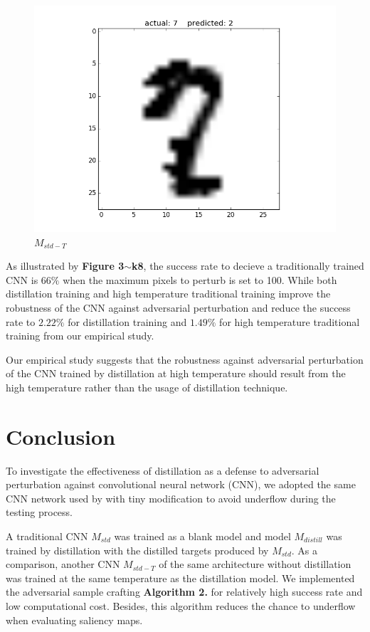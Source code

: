 \documentclass{article}
\begin{document}
\begin{figure}[h!]
\begin{minipage}{0.3\textwidth}
		\includegraphics[width=\textwidth]{T.png}
		\caption{$M_{std-T}$}
	\end{minipage} \hfill
\end{figure}

As illustrated by \textbf{Figure 3$\sim$k8}, the success rate to decieve a traditionally trained CNN is $66\%$ when the maximum pixels to perturb is set to 100.
While both distillation training and high temperature traditional training improve the robustness of the CNN against adversarial perturbation and reduce the success rate to $2.22\%$ for distillation training and $1.49\%$ for high temperature traditional training from our empirical study.

Our empirical study suggests that the robustness against adversarial perturbation of the CNN trained by distillation at high temperature should result from the high temperature rather than the usage of distillation technique.

\section{Conclusion}

To investigate the effectiveness of distillation as a defense to adversarial perturbation against convolutional neural network (CNN), we adopted the same CNN network used by \cite{Papernot} with tiny modification to avoid underflow during the testing process.

A traditional CNN $M_{std}$ was trained as a blank model and model $M_{distill}$ was trained by distillation with the distilled targets produced by $M_{std}$.
As a comparison, another CNN $M_{std-T}$ of the same architecture without distillation was trained at the same temperature as the distillation model.
We implemented the adversarial sample crafting \textbf{Algorithm 2.} for relatively high success rate and low computational cost. Besides, this algorithm reduces the chance to underflow when evaluating saliency maps.
\end{document}
